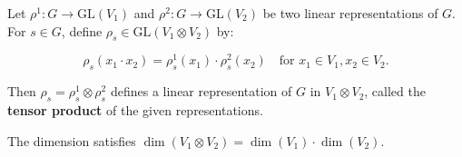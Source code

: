 Let $\rho^1: G \to \text{GL}(V_1)$ and $\rho^2: G \to \text{GL}(V_2)$ be two linear representations of $G$. For $s \in G$, define $\rho_s \in \text{GL}(V_1 \otimes V_2)$ by:

$$\rho_s(x_1 \cdot x_2) = \rho_s^1(x_1) \cdot \rho_s^2(x_2) \quad \text{for } x_1 \in V_1, x_2 \in V_2.$$

Then $\rho_s = \rho_s^1 \otimes \rho_s^2$ defines a linear representation of $G$ in $V_1 \otimes V_2$, called the \textbf{tensor product} of the given representations.

The dimension satisfies $\dim(V_1 \otimes V_2) = \dim(V_1) \cdot \dim(V_2)$.
